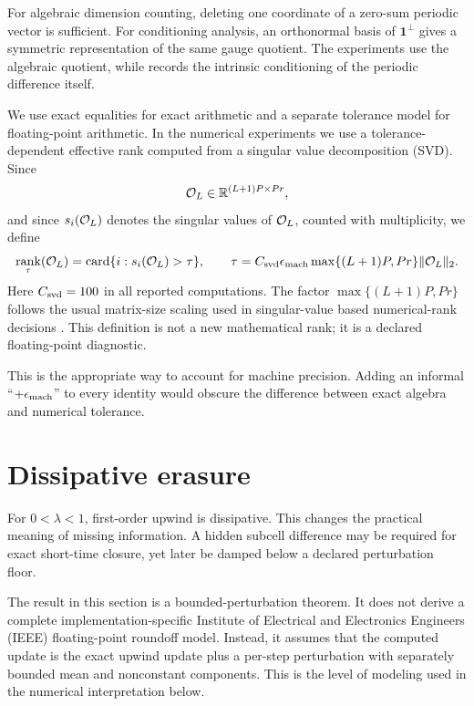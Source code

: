\documentclass[pdflatex,sn-mathphys-num]{sn-jnl}%
\newcommand{\epsmach}{\epsilon_{\rm mach}}
\DeclareMathOperator{\rank}{rank}
\DeclareMathOperator{\card}{card}
\theoremstyle{thmstyleone}%
\theoremstyle{thmstyletwo}%
\theoremstyle{thmstylethree}%
\begin{document}
For algebraic dimension counting, deleting one coordinate of a zero-sum
periodic vector is sufficient.  For conditioning analysis, an orthonormal
basis of \(\mathbf 1^\perp\) gives a symmetric representation of the same
gauge quotient.  The experiments use the algebraic quotient, while
 records the intrinsic conditioning of the
periodic difference itself.

We use exact equalities for exact arithmetic and a separate tolerance model
for floating-point arithmetic.  In the numerical experiments we use a tolerance-dependent effective rank computed from a singular value decomposition (SVD).  Since
\[
  {\cal O}_L\in\mathbb R^{(L+1)P\times Pr},
\]
and since \(s_i({\cal O}_L)\) denotes the singular values of
\({\cal O}_L\), counted with multiplicity, we define
\[
  \rank_\tau({\cal O}_L)
  =
  \card\{i:s_i({\cal O}_L)>\tau\},
  \qquad
  \tau
  =
  C_{\rm svd}\epsmach
  \max\{(L+1)P,Pr\}
  \|{\cal O}_L\|_2 .
\]
Here \(C_{\rm svd}=100\) in all reported computations.  The factor
\(\max\{(L+1)P,Pr\}\) follows the usual matrix-size scaling used in
singular-value based numerical-rank decisions
\cite{TrefethenBau:1997nla,Higham:2002accuracy}.  This definition is not a
new mathematical rank; it is a declared floating-point diagnostic.

This is the appropriate way to account for machine precision.  Adding an
informal ``\(+\epsmach\)'' to every identity would obscure the difference
between exact algebra and numerical tolerance.

\section{Dissipative erasure} \label{sec:diss_eras}

For \(0<\lambda<1\), first-order upwind is dissipative.  This changes the
practical meaning of missing information.  A hidden subcell difference may
be required for exact short-time closure, yet later be damped below a
declared perturbation floor.

The result in this section is a bounded-perturbation theorem.  It does not
derive a complete implementation-specific Institute of Electrical and
Electronics Engineers (IEEE) floating-point roundoff model.  Instead, it
assumes that the computed update is the exact upwind update plus a
per-step perturbation with separately bounded mean and nonconstant
components.  This is the level of modeling used in the numerical
interpretation below.
\end{document}
